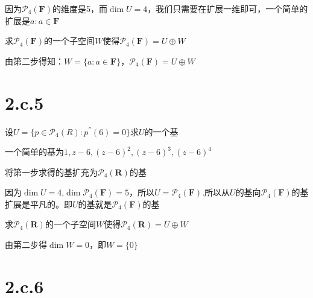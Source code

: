 \documentclass[10pt,a4paper,UTF8]{article}
\begin{document}
\begin{answer}
因为\(\mathcal{P}_{4}( \mathbf{F})\)的维度是5，而\(\dim U = 4\)，我们只需要在扩展一维即可，一个简单的扩展是\(a:a\in \mathbf{F}\)
\end{answer}

\begin{problem}
求\(\mathcal{P}_{4}( \mathbf{F})\)的一个子空间\(W\)使得\(\mathcal{P}_{4}( \mathbf{F}) = U\oplus W\)
\end{problem}

\begin{answer}
由第二步得知：\(W=\{a:a\in \mathbf{F}\}\)，\(\mathcal{P}_{4}( \mathbf{F}) = U \oplus W\)
\end{answer}

\section{2.c.5}
\label{sec:org043dafc}


\begin{problem}
设\(U = \{p\in \mathcal{P}_{4}(R):p^{''}(6)=0\}\)求\(U\)的一个基
\end{problem}

\begin{answer}
一个简单的基为\(1,z-6,(z-6)^{2},(z-6)^{3},(z-6)^{4}\)
\end{answer}

\begin{problem}
将第一步求得的基扩充为\(\mathcal{P}_{4}(\mathbf{R})\)的基
\end{problem}

\begin{answer}
因为\(\dim U = 4\),\(\dim \mathcal{P}_{4}(\mathbf{F}) = 5\)，所以\(U = \mathcal{P}_{4}(\mathbf{F})\).所以从\(U\)的基向\(\mathcal{P}_{4}(\mathbf{F})\)的基扩展是平凡的。即\(U\)的基就是\(\mathcal{P}_{4}(\mathbf{F})\)的基
\end{answer}

\begin{problem}
求\(\mathcal{P}_{4}(\mathbf{R})\)的一个子空间\(W\)使得\(\mathcal{P}_{4}( \mathbf{R}) = U\oplus W\)
\end{problem}

\begin{answer}
由第二步得\(\dim W = 0\)，即\(W = \{0\}\)
\end{answer}

\section{2.c.6}
\label{sec:org82c02df}
\end{document}
